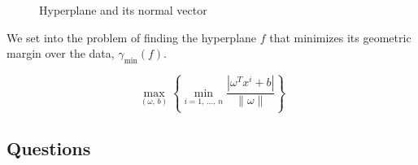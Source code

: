 \begin{figure}[H]
	\caption{Hyperplane and its normal vector}
\end{figure}

We set into the problem of finding the hyperplane $f$ that minimizes
its geometric margin over the data, $\gamma_{\text{min}}(f)$.

\begin{equation*}
	\max_{(\omega,\, b)}
	\left\{
	\min_{i=1,\,\dots,\, n}
	\frac{| \omega^Tx^i + b |}{\lVert\omega\rVert}
	\right\}
\end{equation*}

\subsection*{Questions}

